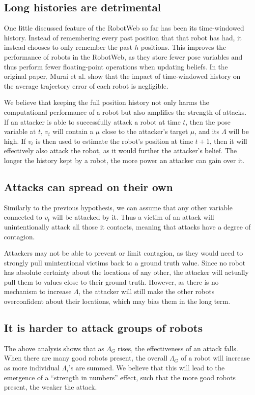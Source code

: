 \subsection{Long histories are detrimental} \label{hyp:3} %
One little discussed feature of the RobotWeb so far has been its time-windowed history. Instead of remembering every past position that that robot has had, it instead chooses to only remember the past $h$ positions. This improves the performance of robots in the RobotWeb, as they store fewer pose variables and thus perform fewer floating-point operations when updating beliefs. In the original paper, Murai et al. show that the impact of time-windowed history on the average trajectory error of each robot is negligible.


We believe that keeping the full position history not only harms the computational performance of a robot but also amplifies the strength of attacks. If an attacker is able to successfully attack a robot at time $t$, then the pose variable at $t$, $v_t$ will contain a $\mu$ close to the attacker's target $\mu$, and its $\Lambda$ will be high. If $v_t$ is then used to estimate the robot's position at time $t+1$, then it will effectively also attack the robot, as it would further the attacker's belief. The longer the history kept by a robot, the more power an attacker can gain over it.

\subsection{Attacks can spread on their own} \label{hyp:4} %
Similarly to the previous hypothesis, we can assume that any other variable connected to $v_t$ will be attacked by it. Thus a victim of an attack will unintentionally attack all those it contacts, meaning that attacks have a degree of contagion. 

Attackers may not be able to prevent or limit contagion, as they would need to strongly pull unintentional victims back to a ground truth value. Since no robot has absolute certainty about the locations of any other, the attacker will actually pull them to values close to their ground truth. However, as there is no mechanism to increase $\Lambda$, the attacker will still make the other robots overconfident about their locations, which may bias them in the long term.

\subsection{It is harder to attack groups of robots} \label{hyp:5}
The above analysis shows that as $\Lambda_G$ rises, the effectiveness of an attack falls. When there are many good robots present, the overall $\Lambda_G$ of a robot will increase as more individual $\Lambda_i$'s are summed. We believe that this will lead to the emergence of a ``strength in numbers'' effect, such that the more good robots present, the weaker the attack.


